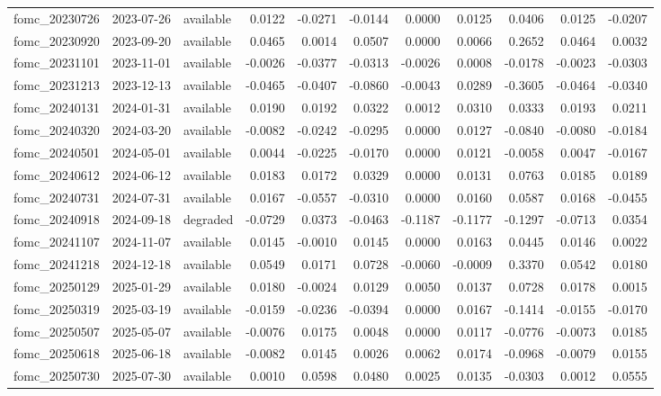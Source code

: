 \begin{tabular}{lllrrrrrrrr}
fomc_20230726 & 2023-07-26 & available & 0.0122 & -0.0271 & -0.0144 & 0.0000 & 0.0125 & 0.0406 & 0.0125 & -0.0207 \\
fomc_20230920 & 2023-09-20 & available & 0.0465 & 0.0014 & 0.0507 & 0.0000 & 0.0066 & 0.2652 & 0.0464 & 0.0032 \\
fomc_20231101 & 2023-11-01 & available & -0.0026 & -0.0377 & -0.0313 & -0.0026 & 0.0008 & -0.0178 & -0.0023 & -0.0303 \\
fomc_20231213 & 2023-12-13 & available & -0.0465 & -0.0407 & -0.0860 & -0.0043 & 0.0289 & -0.3605 & -0.0464 & -0.0340 \\
fomc_20240131 & 2024-01-31 & available & 0.0190 & 0.0192 & 0.0322 & 0.0012 & 0.0310 & 0.0333 & 0.0193 & 0.0211 \\
fomc_20240320 & 2024-03-20 & available & -0.0082 & -0.0242 & -0.0295 & 0.0000 & 0.0127 & -0.0840 & -0.0080 & -0.0184 \\
fomc_20240501 & 2024-05-01 & available & 0.0044 & -0.0225 & -0.0170 & 0.0000 & 0.0121 & -0.0058 & 0.0047 & -0.0167 \\
fomc_20240612 & 2024-06-12 & available & 0.0183 & 0.0172 & 0.0329 & 0.0000 & 0.0131 & 0.0763 & 0.0185 & 0.0189 \\
fomc_20240731 & 2024-07-31 & available & 0.0167 & -0.0557 & -0.0310 & 0.0000 & 0.0160 & 0.0587 & 0.0168 & -0.0455 \\
fomc_20240918 & 2024-09-18 & degraded & -0.0729 & 0.0373 & -0.0463 & -0.1187 & -0.1177 & -0.1297 & -0.0713 & 0.0354 \\
fomc_20241107 & 2024-11-07 & available & 0.0145 & -0.0010 & 0.0145 & 0.0000 & 0.0163 & 0.0445 & 0.0146 & 0.0022 \\
fomc_20241218 & 2024-12-18 & available & 0.0549 & 0.0171 & 0.0728 & -0.0060 & -0.0009 & 0.3370 & 0.0542 & 0.0180 \\
fomc_20250129 & 2025-01-29 & available & 0.0180 & -0.0024 & 0.0129 & 0.0050 & 0.0137 & 0.0728 & 0.0178 & 0.0015 \\
fomc_20250319 & 2025-03-19 & available & -0.0159 & -0.0236 & -0.0394 & 0.0000 & 0.0167 & -0.1414 & -0.0155 & -0.0170 \\
fomc_20250507 & 2025-05-07 & available & -0.0076 & 0.0175 & 0.0048 & 0.0000 & 0.0117 & -0.0776 & -0.0073 & 0.0185 \\
fomc_20250618 & 2025-06-18 & available & -0.0082 & 0.0145 & 0.0026 & 0.0062 & 0.0174 & -0.0968 & -0.0079 & 0.0155 \\
fomc_20250730 & 2025-07-30 & available & 0.0010 & 0.0598 & 0.0480 & 0.0025 & 0.0135 & -0.0303 & 0.0012 & 0.0555 \\

\end{tabular}
